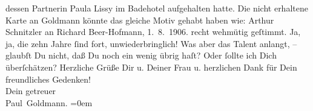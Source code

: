 \begin{ledgroupsized}[t]{13cm}
{{{                  dessen Partnerin Paula Lissy im Badehotel aufgehalten hatte. Die nicht
                  erhaltene Karte an Goldmann könnte das
                  gleiche Motiv gehabt haben wie: Arthur Schnitzler an Richard Beer-Hofmann, 1. 8. 1906.
               }}}\label{K-L03249-1h} recht wehmütig geſtimmt. Ja, ja, die zehn Jahre ſind fort, unwiederbringlich!
               Was aber das Talent anlangt, – glaubſt Du nicht, daß Du noch ein wenig übrig haſt?
               Oder ſollte ich Dich überſchätzen?\pend
           \pstart
           Herzliche Grüße Dir u. Deiner Frau u. herzlichen Dank für Dein freundliches Gedenken! {\\[\baselineskip]}Dein getreuer {\\[\baselineskip]}\spacefill\mbox{Paul Goldmann.}\pend
           \leftskip=0em{}
         
         \endnumbering{}\end{ledgroupsized}  \newcommand{\dateiname}{L03249}\newcommand{\titel}{Paul Goldmann an Arthur Schnitzler, 3. 8. 1906}\newcommand{\editorInnen}{Martin Anton Müller und Laura Untner}
      